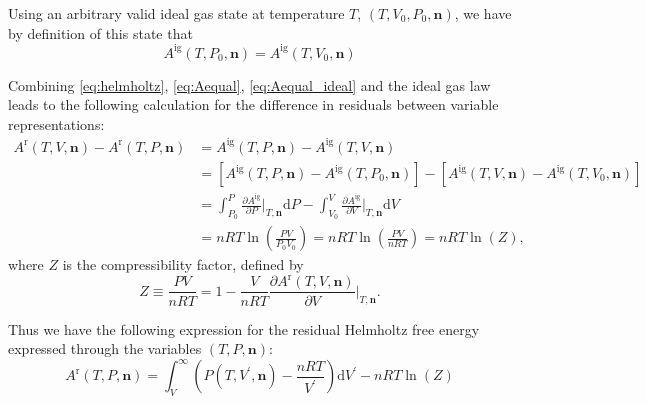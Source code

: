 \documentclass[internal,english]{sintefmemo2012}
\newcommand{\pone}[3]{\frac{\partial #1}{\partial #2}\bigg|_{#3}}%
\newcommand*{\vektor}[1]{\boldsymbol{#1}}%
\newcommand{\dd}[1]{\mathrm{d}{#1}}
\begin{document}
Using an arbitrary valid ideal gas state at temperature $T$, $(T,V_0,P_0,\vektor{n})$, we 
have by definition of this state that 
\begin{equation}
  A^\text{ig}(T,P_0,\vektor{n}) = A^\text{ig}(T,V_0,\vektor{n})
  \label{eq:Aequal_ideal}
\end{equation}

Combining \eqref{eq:helmholtz}, \eqref{eq:Aequal}, \eqref{eq:Aequal_ideal} and the ideal gas law  
leads to the following calculation 
for the difference in residuals between variable representations:
\begin{align}
  A^\text{r}(T,V,\vektor{n}) - A^\text{r}(T,P,\vektor{n}) 
  &= A^\text{ig}(T,P,\vektor{n}) - A^\text{ig}(T,V,\vektor{n})
  \nonumber \\
  &=\left[A^\text{ig}(T,P,\vektor{n}) - A^\text{ig}(T,P_0,\vektor{n})\right]
  -
  \left[A^\text{ig}(T,V,\vektor{n}) - A^\text{ig}(T,V_0,\vektor{n})\right]
  \nonumber\\
  &=\int_{P_0}^P 
  \pone{A^\text{ig}}{P}{T,\vektor{n}}
  \dd{P}
  -
  \int_{V_0}^V 
  \pone{A^\text{ig}}{V}{T,\vektor{n}}
  \dd{V}
  \nonumber\\
  &= nRT \ln\left( \frac{PV}{P_0 V_0} \right) 
  = nRT \ln\left( \frac{PV}{nRT} \right) 
  = nRT \ln\left( Z \right),
  \label{}
\end{align}
where $Z$ is the compressibility factor, defined by
\begin{equation}
  Z \equiv \frac{PV}{nRT} = 1 - \frac{V}{nRT} \pone{A^\text{r}(T,V,\vektor{n})}{V}{T,\vektor{n}} .
  \label{eq:Z_def}
\end{equation}

Thus we have the following expression for the residual Helmholtz free energy expressed through the 
variables $(T,P,\vektor{n})$:
\begin{equation}
\label{eq:helmholtz_int_TPN}
A^{\text{r}}(T,P,\vektor{n})  = \int_V^\infty \left(P(T,V^\prime,\vektor{n}) - \frac{nRT}{V^\prime}\right) \dd{V^\prime} 
-nRT \ln\left( Z \right)
\end{equation}
\end{document}
